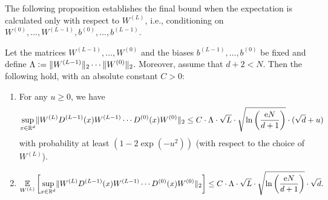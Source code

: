The following proposition establishes the final bound when the expectation is calculated only with respect to $W^{(L)}$, i.e., conditioning on $W^{(0)}, ..., W^{(L-1)}, b^{(0)}, ..., b^{(L-1)}$. 
\begin{proposition}\label{thm:deep_final}
Let the matrices $W^{(L-1)}, ..., W^{(0)}$ and the biases $b^{(L-1)}, ..., b^{(0)}$ be fixed and define $\Lambda \mathrel{\mathop:}= \Vert W^{(L-1)} \Vert_2 \cdots \Vert W^{(0)} \Vert_2$. Moreover, assume that $d+2 <  N$. Then the following hold, with an absolute constant $C>0$:
\begin{enumerate}
\item{ \label{item:deep_highprob} For any $u \geq 0$, we have
\begin{equation*}
\underset{x \in \mathbb{R}^d}{\sup} \Vert W^{(L)}D^{(L-1)}(x)W^{(L-1)}\cdots D^{(0)}(x) W^{(0)} \Vert_2 \leq C \cdot \Lambda \cdot \sqrt{L} \cdot \sqrt{\ln \left(\frac{\mathrm{e} N}{d+1}\right)} \cdot (\sqrt{d} + u)
\end{equation*}
with probability at least $(1 - 2\exp(-u^2))$ (with respect to the choice of $W^{(L)}$).
}
\item{
$\displaystyle
\underset{W^{(L)}}{\mathbb{E}} \left[\underset{x \in \mathbb{R}^d}{\sup} \Vert W^{(L)}D^{(L-1)}(x)W^{(L-1)}\cdots D^{(0)}(x) W^{(0)} \Vert_2 \right] \leq C \cdot \Lambda \cdot \sqrt{L} \cdot \sqrt{\ln \left(\frac{\mathrm{e} N}{d+1}\right)} \cdot \sqrt{d}.
$
}
\end{enumerate}
\end{proposition}

